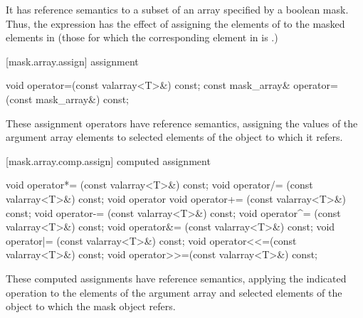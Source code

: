\begin{itemdescr}
\pnum
It has reference semantics to a subset of an array specified by a boolean mask.
Thus, the expression
has the effect of assigning the elements of
to the masked
elements in
(those for which the corresponding element
in
is
.)
\end{itemdescr}

[mask.array.assign]{ assignment}

%
\begin{itemdecl}
void operator=(const valarray<T>&) const;
const mask_array& operator=(const mask_array&) const;
\end{itemdecl}

\begin{itemdescr}
\pnum
These assignment operators have reference semantics, assigning the values
of the argument array elements to selected elements of the
object to which it refers.
\end{itemdescr}

[mask.array.comp.assign]{ computed assignment}

%
%
%
%
%
%
%
%
%
%
\begin{itemdecl}
void operator*= (const valarray<T>&) const;
void operator/= (const valarray<T>&) const;
void operator%
void operator+= (const valarray<T>&) const;
void operator-= (const valarray<T>&) const;
void operator^= (const valarray<T>&) const;
void operator&= (const valarray<T>&) const;
void operator|= (const valarray<T>&) const;
void operator<<=(const valarray<T>&) const;
void operator>>=(const valarray<T>&) const;
\end{itemdecl}

\begin{itemdescr}
\pnum
These computed assignments have reference semantics, applying the
indicated operation to the elements of the argument array and selected elements
of the
object to which the mask object refers.
\end{itemdescr}

